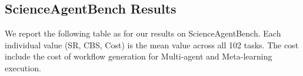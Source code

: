 \documentclass{article}
\begin{document}


\subsection{ScienceAgentBench Results}

We report the following table as for our results on ScienceAgentBench. Each individual value (SR, CBS, Cost) is the mean value across all 102 tasks. The cost include the cost of workflow generation for Multi-agent and Meta-learning execution.
\end{document}
